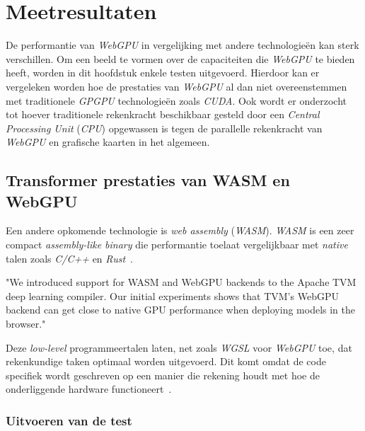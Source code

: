 \chapter{Meetresultaten}%
\label{ch:benchmarks}

De performantie van \textit{WebGPU} in vergelijking met andere technologieën kan sterk verschillen. Om een beeld te vormen over de capaciteiten die \textit{WebGPU} te bieden heeft, worden in dit hoofdstuk enkele testen uitgevoerd. Hierdoor kan er vergeleken worden hoe de prestaties van \textit{WebGPU} al dan niet overeenstemmen met traditionele \textit{GPGPU} technologieën zoals \textit{CUDA}. Ook wordt er onderzocht tot hoever traditionele rekenkracht beschikbaar gesteld door een \textit{Central Processing Unit} (\textit{CPU}) opgewassen is tegen de parallelle rekenkracht van \textit{WebGPU} en grafische kaarten in het algemeen.

\section{Transformer prestaties van WASM en WebGPU}

Een andere opkomende technologie is \textit{web assembly} (\textit{WASM}). \textit{WASM} is een zeer compact \textit{assembly-like binary} die performantie toelaat vergelijkbaar met \textit{native} talen zoals \textit{C/C++} en \textit{Rust}~\autocite{Steiner2023}.

\begin{displayquote}
    "We introduced support for WASM and WebGPU backends to the Apache TVM deep learning compiler. Our initial experiments shows that TVM's WebGPU backend can get close to native GPU performance when deploying models in the browser."
\end{displayquote}

Deze \textit{low-level} programmeertalen laten, net zoals \textit{WGSL} voor \textit{WebGPU} toe, dat rekenkundige taken optimaal worden uitgevoerd. Dit komt omdat de code specifiek wordt geschreven op een manier die rekening houdt met hoe de onderliggende hardware functioneert~\autocite{Knight2020}.

\begin{figure}
    \centering
    
\end{figure}
\label{sec:transformerbench}

\subsection{Uitvoeren van de test}

